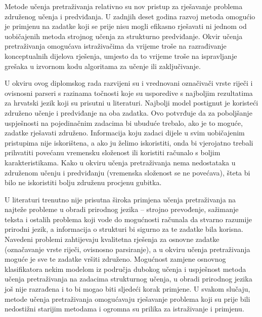 Metode učenja pretraživanja relativno su nov pristup za rješavanje problema
združenog učenja i predviđanja. U zadnjih deset godina razvoj metoda omogućio je
primjenu na zadatke koji se prije nisu mogli efikasno rješavati ni jednom od
uobičajenih metoda strojnog učenja za strukturno predviđanje. Okvir učenja
pretraživanja omogućava istraživačima da vrijeme troše na razrađivanje
konceptualnih dijelova rješenja, umjesto da to vrijeme troše na ispravljanje
grešaka u izvornom kodu algoritama za učenje ili zaključivanje.

U okviru ovog diplomskog rada razvijeni su i vrednovani označivači vrste riječi
i ovisnosni parseri s razinama točnosti koje su usporedive s najboljim
rezultatima za hrvatski jezik koji su prisutni u literaturi. Najbolji model
postignut je koristeći združeno učenje i predviđanje na oba zadatka. Ovo
potvrđuje da za poboljšanje uspješnosti na pojedinačnim zadacima bi ubuduće
trebalo, ako je to moguće, zadatke rješavati združeno. Informacija koju zadaci
dijele u svim uobičajenim pristupima nije iskorištena, a ako ju želimo
iskoristiti, onda bi vjerojatno trebali prihvatiti povećanu vremensku složenost
ili koristiti računalo s boljim karakteristikama. Kako u okviru učenja
pretraživanja nema nedostataka u združenom učenju i predviđanju (vremenska
složenost se ne povećava), šteta bi bilo ne iskoristiti bolju združenu procjenu
gubitka.

U literaturi trenutno nije prisutna široka primjena učenja pretraživanja na
najteže probleme u obradi prirodnog jezika -- strojno prevođenje, sažimanje
teksta i ostalih problema koji vode do mogućnosti računala da stvarno razumije
prirodni jezik, a informacija o strukturi bi sigurno za te zadatke bila korisna.
Navedeni problemi zahtijevaju kvalitetna rješenja za osnovne zadatke
(označavanje vrste riječi, ovisnosno parsiranje), a u okviru učenja
pretraživanja moguće je sve te zadatke vršiti združeno. Mogućnost zamjene
osnovnog klasifikatora nekim modelom iz područja dubokog učenja  i uspješnost metoda učenja pretraživanja na zadacima strukturnog
učenja, u obradi prirodnog jezika još nije razrađena i to bi mogao biti sljedeći
korak primjene. U svakom slučaju, metode učenja pretraživanja omogućavaju
rješavanje problema koji su prije bili nedostižni starijim metodama i ogromna su
prilika za istraživanje i primjenu.
